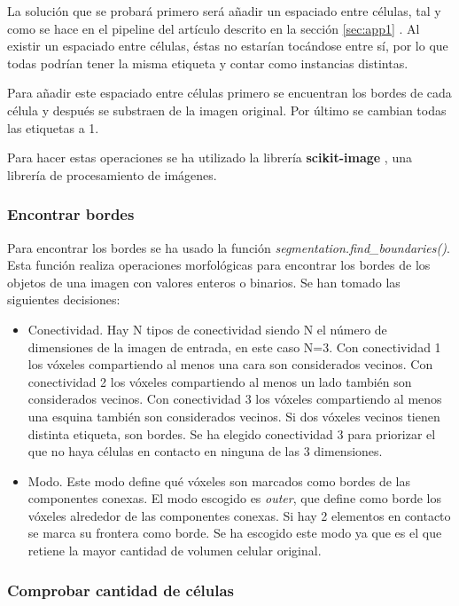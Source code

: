 La solución que se probará primero será añadir un espaciado entre células, tal y como se hace en el pipeline del artículo descrito en la sección \ref{sec:app1} \cite{Falk2019}. Al existir un espaciado entre células, éstas no estarían tocándose entre sí, por lo que todas podrían tener la misma etiqueta y contar como instancias distintas.

Para añadir este espaciado entre células primero se encuentran los bordes de cada célula y después se substraen de la imagen original. Por último se cambian todas las etiquetas a 1.

Para hacer estas operaciones se ha utilizado la librería \textbf{scikit-image} \cite{Walt2014}, una librería de procesamiento de imágenes.

\subsubsection{Encontrar bordes}\label{subsubsec:multi_find_borders}

Para encontrar los bordes se ha usado la función \textit{segmentation.find\_boundaries()}. Esta función realiza operaciones morfológicas para encontrar los bordes de los objetos de una imagen con valores enteros o binarios. Se han tomado las siguientes decisiones:
\begin{itemize}
\item Conectividad. Hay N tipos de conectividad siendo N el número de dimensiones de la imagen de entrada, en este caso N=3. Con conectividad 1 los vóxeles compartiendo al menos una cara son considerados vecinos. Con conectividad 2 los vóxeles compartiendo al menos un lado también son considerados vecinos. Con conectividad 3 los vóxeles compartiendo al menos una esquina también son considerados vecinos. Si dos vóxeles vecinos tienen distinta etiqueta, son bordes. Se ha elegido conectividad 3 para priorizar el que no haya células en contacto en ninguna de las 3 dimensiones.
\item Modo. Este modo define qué vóxeles son marcados como bordes de las componentes conexas. El modo escogido es \textit{outer}, que define como borde los vóxeles alrededor de las componentes conexas. Si hay 2 elementos en contacto se marca su frontera como borde. Se ha escogido este modo ya que es el que retiene la mayor cantidad de volumen celular original.
\end{itemize}

\subsubsection{Comprobar cantidad de células}\label{subsubsec:multi_count_cells}

